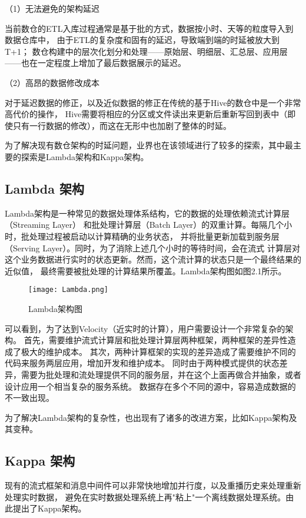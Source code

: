 （1）无法避免的架构延迟

当前数仓的ETL入库过程通常是基于批的方式，数据按小时、天等的粒度导入到数据仓库中，
由于ETL的复杂度和固有的延迟，导致端到端的时延被放大到T+1；
数仓构建中的层次化划分和处理——原始层、明细层、汇总层、应用层——也在一定程度上增加了最后数据展示的延迟。

（2）高昂的数据修改成本

对于延迟数据的修正，以及近似数据的修正在传统的基于Hive的数仓中是一个非常高代价的操作，
Hive需要将相应的分区或文件读出来更新后重新写回到表中（即使只有一行数据的修改），而这在无形中也加剧了整体的时延。

为了解决现有数仓架构的时延问题，业界也在该领域进行了较多的探索，其中最主要的探索是Lambda架构和Kappa架构。

\subsection{Lambda 架构}

Lambda架构是一种常见的数据处理体系结构，它的数据的处理依赖流式计算层（Streaming Layer）
和批处理计算层（Batch Layer）的双重计算。每隔几个小时，批处理过程被启动以计算精确的业务状态，
并将批量更新加载到服务层（Serving Layer）。同时，为了消除上述几个小时的等待时间，会在流式
计算层对这个业务数据进行实时的状态更新。然而，这个流计算的状态只是一个最终结果的近似值，
最终需要被批处理的计算结果所覆盖。Lambda架构图如图2.1所示。

\begin{figure}[h]
  \centering
  \texttt{[image: Lambda.png]}
  \caption{Lambda架构图}
  \label{fig:badge}
\end{figure}

可以看到，为了达到Velocity（近实时的计算），用户需要设计一个非常复杂的架构。
首先，需要维护流式计算层和批处理计算层两种框架，两种框架的差异性造成了极大的维护成本。
其次，两种计算框架的实现的差异造成了需要维护不同的代码来服务两层应用，增加开发和维护成本。
同时由于两种模式提供的状态差异，需要为批处理和流处理提供不同的服务层，并在这个上面再做合并抽象，或者设计应用一个相当复杂的服务系统。
数据存在多个不同的源中，容易造成数据的不一致出现。

为了解决Lambda架构的复杂性，也出现有了诸多的改进方案，比如Kappa架构及其变种。

\subsection{Kappa 架构}

现有的流式框架和消息中间件可以非常快地增加并行度，以及重播历史来处理重新处理实时数据，
避免在实时数据处理系统上再"粘上"一个离线数据处理系统。由此提出了Kappa架构。

